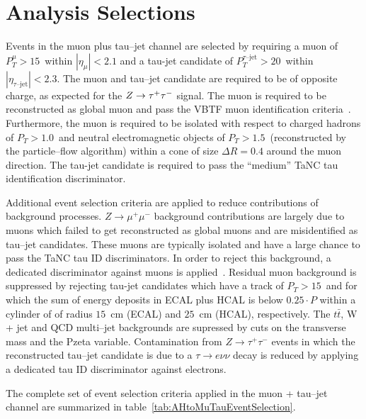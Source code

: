 \ifx\master\undefined\fi

\chapter{Analysis Selections}
\label{ch:selections}

Events in the muon plus tau--jet channel are selected by requiring a muon of
$P_{T}^{\mu} > 15$~\GeV within $ \left| \eta_{\mu} \right| < 2.1$ and a tau-jet
candidate of $P_{T}^{\tau\mbox{--jet}} > 20$~\GeV within $ \left|
\eta_{\tau\mbox{--jet}} \right| < 2.3$. The muon and tau--jet candidate are
required to be of opposite charge, as expected for the $Z\to\tau^+\tau^-$ signal.  The muon
is required to be reconstructed as global muon and pass the VBTF muon
identification criteria~\cite{EWK-10-002}. Furthermore, the muon is required to
be isolated with respect to charged hadrons of $P_{T} > 1.0$~\GeV and neutral
electromagnetic objects of $P_{T} > 1.5$~\GeV (reconstructed by the
particle--flow algorithm) within a cone of size $\Delta R = 0.4$ around the muon
direction.  The tau-jet candidate is required to pass the ``medium'' TaNC tau
identification discriminator.

Additional event selection criteria are applied to reduce
contributions of background processes. $Z
\rightarrow \mu^{+} \mu^{-}$ background contributions are largely due
to muons which failed to get reconstructed as global muons and are
misidentified as tau--jet candidates. These muons are typically
isolated and have a large chance to pass the TaNC tau ID discriminators. 
In order to reject this background, a dedicated
discriminator against muons is applied~\cite{PFT-08-001}. Residual
muon background is suppressed by rejecting tau-jet candidates which have
a track of $P_{T} > 15$~\GeV and for which the sum of energy deposits
in ECAL plus HCAL is below $0.25 \cdot P$ within a cylinder of
of radius $15$~cm (ECAL) and $25$~cm (HCAL), respectively.
The $t\bar{t}$, W + jet and QCD multi--jet backgrounds are supressed
by cuts on the transverse mass and the Pzeta variable.
Contamination from $Z
\rightarrow \tau^{+} \tau^{-}$ events in which the reconstructed
tau--jet candidate is due to a $\tau \rightarrow e \nu \nu$ decay is
reduced by applying a dedicated tau ID discriminator against
electrons.

The complete set of event selection criteria applied in the muon +
tau--jet channel are summarized in table~\ref{tab:AHtoMuTauEventSelection}.

